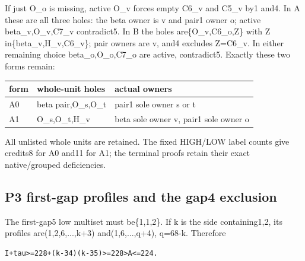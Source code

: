 \documentclass[10pt,a4paper]{article}
\theoremstyle{definition}
\begin{document}
If just O\_\allowbreak{}o is missing,\allowbreak{} active O\_\allowbreak{}v forces empty C6\_\allowbreak{}v and C5\_\allowbreak{}v by1
and4. In A these are all three holes: the beta owner is v and pair1
owner o; active beta\_\allowbreak{}v,\allowbreak{}O\_\allowbreak{}v,\allowbreak{}C7\_\allowbreak{}v contradict5. In B the holes
are\{O\_\allowbreak{}v,\allowbreak{}C6\_\allowbreak{}o,\allowbreak{}Z\} with Z in\{beta\_\allowbreak{}v,\allowbreak{}H\_\allowbreak{}v,\allowbreak{}C6\_\allowbreak{}v\}; pair owners are v,\allowbreak{}
and4 excludes Z=\allowbreak{}C6\_\allowbreak{}v. In either remaining choice beta\_\allowbreak{}o,\allowbreak{}O\_\allowbreak{}o,\allowbreak{}C7\_\allowbreak{}o are
active,\allowbreak{} contradict5. Exactly these two forms remain:

\begin{longtable}[]{@{}lll@{}}
\toprule\noalign{}
form & whole-unit holes & actual owners \\
\midrule\noalign{}
\endhead
\bottomrule\noalign{}
\endlastfoot
A0 & beta pair,\allowbreak{}O\_\allowbreak{}s,\allowbreak{}O\_\allowbreak{}t & pair1 sole owner s or t \\
A1 & O\_\allowbreak{}s,\allowbreak{}O\_\allowbreak{}t,\allowbreak{}H\_\allowbreak{}v & beta sole owner v,\allowbreak{} pair1 sole owner o \\
\end{longtable}

All unlisted whole units are retained. The fixed HIGH/LOW label counts
give credits8 for A0 and11 for A1; the terminal proofs retain their
exact native/grouped deficiencies.

\hypertarget{p3-first-gap-profiles-and-the-gap4-exclusion}{%
\subsection{P3 first-gap profiles and the gap4
exclusion}\label{p3-first-gap-profiles-and-the-gap4-exclusion}}

The first-gap5 low multiset must be\{1,\allowbreak{}1,\allowbreak{}2\}. If k is the side
containing1,\allowbreak{}2,\allowbreak{} its profiles are(1,\allowbreak{}2,\allowbreak{}6,\allowbreak{}...,\allowbreak{}k+\allowbreak{}3) and(1,\allowbreak{}6,\allowbreak{}...,\allowbreak{}q+\allowbreak{}4),\allowbreak{} q=\allowbreak{}68-k.
Therefore

\begin{lstlisting}
I+tau>=228+(k-34)(k-35)>=228>A<=224.
\end{lstlisting}
\end{document}
